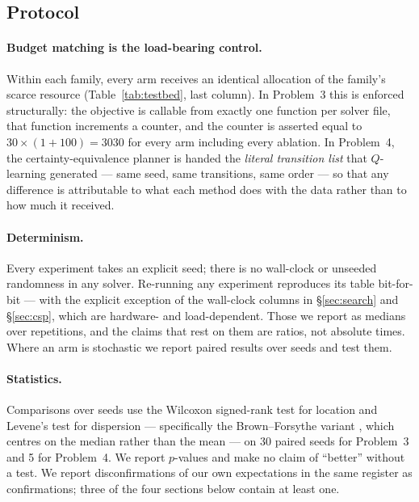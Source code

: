 \documentclass[11pt]{article}
\begin{document}
\subsection{Protocol}

\paragraph{Budget matching is the load-bearing control.} Within each family, every arm receives an
identical allocation of the family's scarce resource (Table~\ref{tab:testbed}, last column). In
Problem~3 this is enforced structurally: the objective is callable from exactly one function per
solver file, that function increments a counter, and the counter is asserted equal to
$30 \times (1 + 100) = 3030$ for every arm including every ablation. In Problem~4, the
certainty-equivalence planner is handed the \emph{literal transition list} that $Q$-learning
generated --- same seed, same transitions, same order --- so that any difference is attributable to
what each method does with the data rather than to how much it received.

\paragraph{Determinism.} Every experiment takes an explicit seed; there is no wall-clock or
unseeded randomness in any solver. Re-running any experiment reproduces its table bit-for-bit ---
with the explicit exception of the wall-clock columns in \S\ref{sec:search} and \S\ref{sec:csp},
which are hardware- and load-dependent. Those we report as medians over repetitions, and the
claims that rest on them are ratios, not absolute times.
Where an arm is stochastic we report paired results over seeds and test them.

\paragraph{Statistics.} Comparisons over seeds use the Wilcoxon signed-rank test
\citep{wilcoxon1945individual} for location and Levene's test \citep{levene1960robust} for
dispersion --- specifically the Brown--Forsythe variant \citep{brown1974robust}, which centres on
the median rather than the mean --- on 30 paired seeds for Problem~3 and 5 for Problem~4. We report
$p$-values and make no claim of ``better'' without a test. We report disconfirmations of our own
expectations in the same register as confirmations; three of the four sections below contain at
least one.
\end{document}
